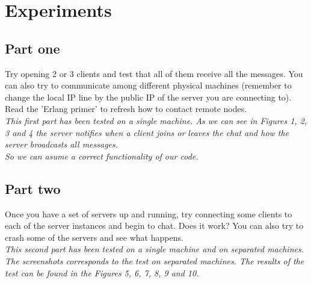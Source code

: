 \section{Experiments}

\subsection{Part one}
Try opening 2 or 3 clients and test that all of them receive all the messages. You can also try to communicate among different physical machines (remember to change the local IP line by the public IP of the server you are connecting to). Read the ’Erlang primer’ to refresh how to contact remote nodes. \\

\textit{This first part has been tested on a single machine. As we can see in Figures 1, 2, 3 and 4 the server notifies when a client joins or leaves the chat and how the server broadcasts all messages.\\
So we can asume a correct functionality of our code.}

\subsection{Part two}
Once you have a set of servers up and running, try connecting some clients to each of the server instances and begin to chat. Does it work?
You can also try to crash some of the servers and see what happens. \\

\textit{This second part has been tested on a single machine and on separated machines. The screenshots corresponds to the test on separated machines.
The results of the test can be found in the Figures 5, 6, 7, 8, 9 and 10.}